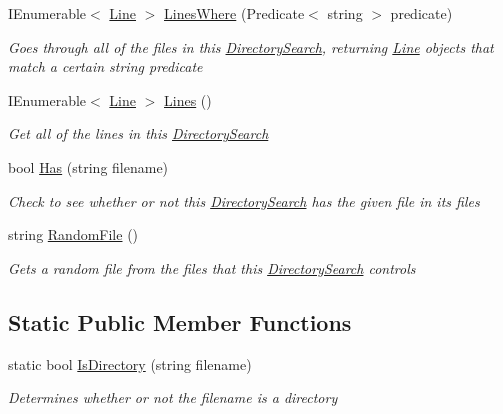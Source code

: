 \begin{DoxyCompactItemize}
I\+Enumerable$<$ \hyperlink{classHumDrum_1_1Operations_1_1Files_1_1Line}{Line} $>$ \hyperlink{classHumDrum_1_1Operations_1_1Files_1_1DirectorySearch_a34bffb903db014a0d91d7b1faae3b387}{Lines\+Where} (Predicate$<$ string $>$ predicate)
\begin{DoxyCompactList}\small\item\em Goes through all of the files in this \hyperlink{classHumDrum_1_1Operations_1_1Files_1_1DirectorySearch}{Directory\+Search}, returning \hyperlink{classHumDrum_1_1Operations_1_1Files_1_1Line}{Line} objects that match a certain string predicate \end{DoxyCompactList}\item 
I\+Enumerable$<$ \hyperlink{classHumDrum_1_1Operations_1_1Files_1_1Line}{Line} $>$ \hyperlink{classHumDrum_1_1Operations_1_1Files_1_1DirectorySearch_a97721cf17c7a08ca86cc1692cc0543fd}{Lines} ()
\begin{DoxyCompactList}\small\item\em Get all of the lines in this \hyperlink{classHumDrum_1_1Operations_1_1Files_1_1DirectorySearch}{Directory\+Search} \end{DoxyCompactList}\item 
bool \hyperlink{classHumDrum_1_1Operations_1_1Files_1_1DirectorySearch_acd1d24435e4213a0b6637dcfcb0ae912}{Has} (string filename)
\begin{DoxyCompactList}\small\item\em Check to see whether or not this \hyperlink{classHumDrum_1_1Operations_1_1Files_1_1DirectorySearch}{Directory\+Search} has the given file in its files \end{DoxyCompactList}\item 
string \hyperlink{classHumDrum_1_1Operations_1_1Files_1_1DirectorySearch_ab7cab2ae15d22f5c61969961e3c0e433}{Random\+File} ()
\begin{DoxyCompactList}\small\item\em Gets a random file from the files that this \hyperlink{classHumDrum_1_1Operations_1_1Files_1_1DirectorySearch}{Directory\+Search} controls \end{DoxyCompactList}\end{DoxyCompactItemize}
\subsection*{Static Public Member Functions}
\begin{DoxyCompactItemize}
\item 
static bool \hyperlink{classHumDrum_1_1Operations_1_1Files_1_1DirectorySearch_aeb357481f2a6da6120ef91257f810cbd}{Is\+Directory} (string filename)
\begin{DoxyCompactList}\small\item\em Determines whether or not the filename is a directory \end{DoxyCompactList}\end{DoxyCompactItemize}
